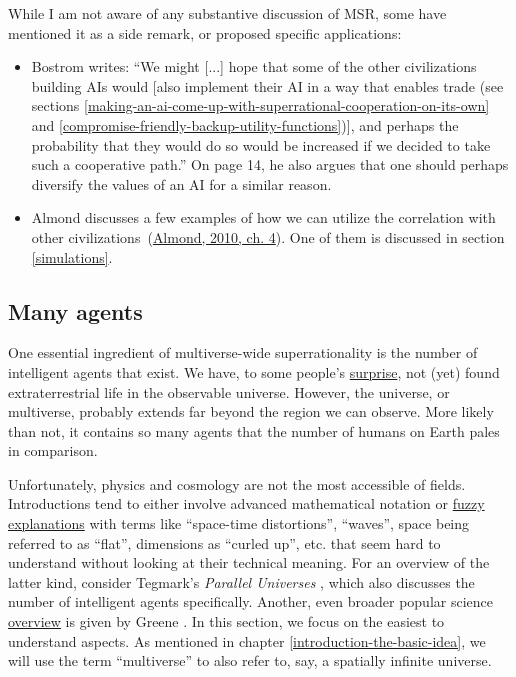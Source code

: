 While I am not aware of any substantive discussion of MSR, some have
mentioned it as a side remark, or proposed specific applications:

\begin{itemize}
\item
  Bostrom writes: ``We might {[}...{]}
  hope that some of the other civilizations building AIs would {[}also
  implement their AI in a way that enables trade (see sections
  \ref{making-an-ai-come-up-with-superrational-cooperation-on-its-own} and
  \ref{compromise-friendly-backup-utility-functions}){]}, and perhaps the probability that
  they would do so would be increased if we decided to take such a
  cooperative path.'' \parencite{Bostrom2014-gy} On page 14, he also argues that one should perhaps
  diversify the values of an AI for a similar reason.
\item
  Almond discusses a few examples of how we can utilize the correlation
  with other
  civilizations~(\href{https://casparoesterheld.files.wordpress.com/2017/03/correlation2.pdf}{Almond,
  2010, ch. 4}). One of them is discussed in section \ref{simulations}.
\end{itemize}

\hypertarget{many-agents}{\subsection{Many agents}\label{many-agents}}

One essential ingredient of multiverse-wide superrationality is the
number of intelligent agents that exist. We have, to some people's
\href{https://en.wikipedia.org/wiki/Fermi_paradox}{surprise}, not
(yet) found extraterrestrial life in the observable universe. However,
the universe, or multiverse, probably extends far beyond the region we
can observe. More likely than not, it contains so many agents that the
number of humans on Earth pales in comparison.

Unfortunately, physics and cosmology are not the most accessible of
fields. Introductions tend to either involve advanced mathematical
notation or
\href{http://lesswrong.com/lw/ip/fake_explanations/}{fuzzy
explanations} with terms like ``space-time distortions'', ``waves'',
space being referred to as ``flat'', dimensions as ``curled up'', etc.
that seem hard to understand without looking at their technical meaning.
For an overview of the latter kind, consider Tegmark's
\emph{Parallel Universes} \citeyear{Tegmark2003-sl},
which also discusses the number of intelligent agents specifically.
Another, even broader popular science
\href{https://en.wikipedia.org/wiki/Multiverse\#Brian_Greene.27s_nine_types}{overview}
is given by Greene \citeyear{Greene2011-hv}. In this section, we
focus on the easiest to understand aspects. As mentioned in chapter
\ref{introduction-the-basic-idea}, we will use the term ``multiverse'' to also refer
to, say, a spatially infinite universe.

